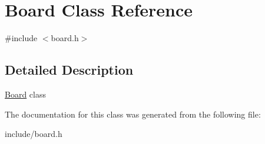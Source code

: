 \hypertarget{classBoard}{}\section{Board Class Reference}
\label{classBoard}


{\ttfamily \#include $<$board.\+h$>$}



\subsection{Detailed Description}
\mbox{\hyperlink{classBoard}{Board}} class 

The documentation for this class was generated from the following file\+:\begin{DoxyCompactItemize}
\item 
include/board.\+h\end{DoxyCompactItemize}
